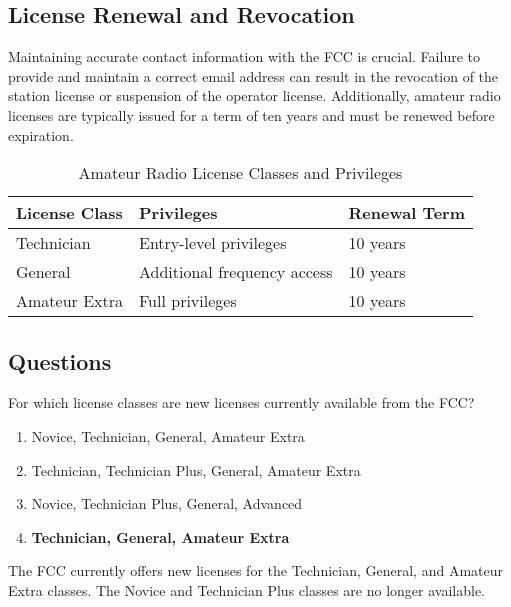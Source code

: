\subsection*{License Renewal and Revocation}
Maintaining accurate contact information with the FCC is crucial. Failure to provide and maintain a correct email address can result in the revocation of the station license or suspension of the operator license. Additionally, amateur radio licenses are typically issued for a term of ten years and must be renewed before expiration.

\begin{table}[h!]
    \centering
    \caption{Amateur Radio License Classes and Privileges}
    \label{tab:license_classes}
    \begin{tabular}{|l|l|l|}
        \hline
        \textbf{License Class} & \textbf{Privileges} & \textbf{Renewal Term} \\ \hline
        Technician & Entry-level privileges & 10 years \\ \hline
        General & Additional frequency access & 10 years \\ \hline
        Amateur Extra & Full privileges & 10 years \\ \hline
    \end{tabular}
\end{table}

\subsection*{Questions}
\begin{tcolorbox}[colback=gray!10!white,colframe=black!75!black,title={T1C01}]
    For which license classes are new licenses currently available from the FCC?
    \begin{enumerate}[label=\Alph*,noitemsep]
        \item Novice, Technician, General, Amateur Extra
        \item Technician, Technician Plus, General, Amateur Extra
        \item Novice, Technician Plus, General, Advanced
        \item \textbf{Technician, General, Amateur Extra}
    \end{enumerate}
\end{tcolorbox}
The FCC currently offers new licenses for the Technician, General, and Amateur Extra classes. The Novice and Technician Plus classes are no longer available.

